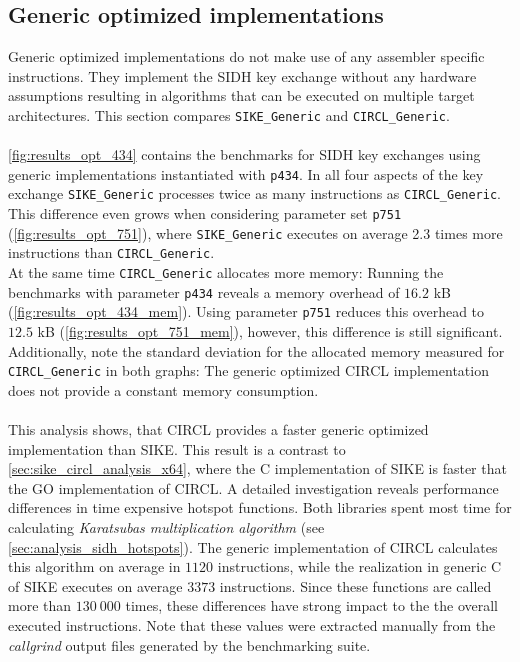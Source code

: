 \subsection{Generic optimized implementations}\label{sec:sike_circl_analysis_generic}
Generic optimized implementations do not make use of any assembler specific instructions. They implement the \gls{SIDH} key exchange without any hardware assumptions resulting in  algorithms that can be executed on multiple target architectures. This section compares \texttt{SIKE\_Generic} and \texttt{CIRCL\_Generic}.
\\\\
\autoref{fig:results_opt_434} contains the benchmarks for \gls{SIDH} key exchanges using generic implementations instantiated with \texttt{p434}.  In all four aspects of the key exchange \texttt{SIKE\_Generic} processes twice as many instructions as \texttt{CIRCL\_Generic}. This difference even grows when considering parameter set \texttt{p751} (\autoref{fig:results_opt_751}), where \texttt{SIKE\_Generic} executes on average 2.3 times more instructions than \texttt{CIRCL\_Generic}.\\
At the same time \texttt{CIRCL\_Generic} allocates more memory: Running the benchmarks with parameter \texttt{p434} reveals a memory overhead of $16.2$ \gls{kB} (\autoref{fig:results_opt_434_mem}). Using parameter \texttt{p751} reduces this overhead to $12.5$ \gls{kB} (\autoref{fig:results_opt_751_mem}), however, this difference is still significant. Additionally, note the standard deviation for the allocated memory measured for \texttt{CIRCL\_Generic} in both graphs: The generic optimized \gls{CIRCL} implementation does not provide a constant memory consumption.
\\\\
This analysis shows, that \gls{CIRCL} provides a faster generic optimized implementation than \gls{SIKE}. This result is a contrast to \autoref{sec:sike_circl_analysis_x64}, where the C implementation of \gls{SIKE} is faster that the GO implementation of \gls{CIRCL}. A detailed investigation reveals performance differences in time expensive hotspot functions. Both libraries spent most time for calculating \textit{Karatsubas multiplication algorithm} (see \autoref{sec:analysis_sidh_hotspots}). The generic implementation of \gls{CIRCL} calculates this algorithm on average in $1120$ instructions, while the realization in generic C of \gls{SIKE} executes on average $3373$ instructions. Since these functions are called more than $130\:000$ times, these differences have strong impact to the the overall executed instructions. Note that these values were extracted manually from the \textit{callgrind} output files generated by the benchmarking suite.

